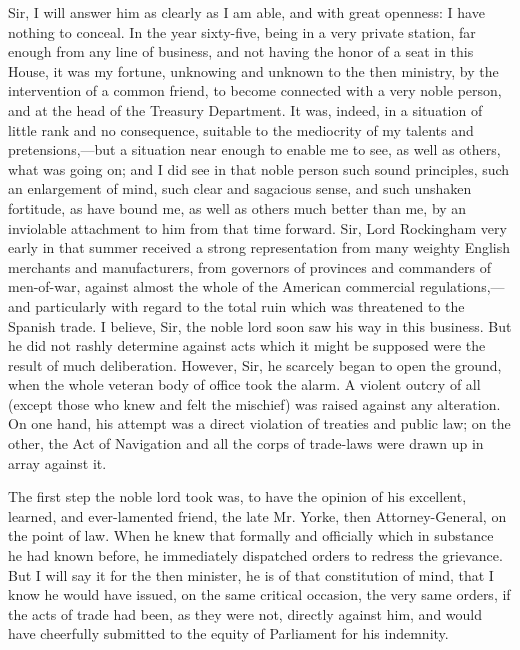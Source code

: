 Sir, I will answer him as clearly as I am able, and with great openness: I have nothing to conceal. In the year sixty-five, being in a very private station, far enough from any line of business, and not having the honor of a seat in this House, it was my fortune, unknowing and unknown to the then ministry, by the intervention of a common friend, to become connected with a very noble person, and at the head of the Treasury Department. It was, indeed, in a situation of little rank and no consequence, suitable to the mediocrity of my talents and pretensions,—but a situation near enough to enable me to see, as well as others, what was going on; and I did see in that noble person such sound principles, such an enlargement of mind, such clear and sagacious sense, and such unshaken fortitude, as have bound me, as well as others much better than me, by an inviolable attachment to him from that time forward. Sir, Lord Rockingham very early in that summer received a strong representation from many weighty English merchants and manufacturers, from governors of provinces and commanders of men-of-war, against almost the whole of the American commercial regulations,—and particularly with regard to the total ruin which was threatened to the Spanish trade. I believe, Sir, the noble lord soon saw his way in this business. But he did not rashly determine against acts which it might be supposed were the result of much deliberation. However, Sir, he scarcely began to open the ground, when the whole veteran body of office took the alarm. A violent outcry of all (except those who knew and felt the mischief) was raised against any alteration. On one hand, his attempt was a direct violation of treaties and public law; on the other, the Act of Navigation and all the corps of trade-laws were drawn up in array against it.

The first step the noble lord took was, to have the opinion of his excellent, learned, and ever-lamented friend, the late Mr. Yorke, then Attorney-General, on the point of law. When he knew that formally and officially which in substance he had known before, he immediately dispatched orders to redress the grievance. But I will say it for the then minister, he is of that constitution of mind, that I know he would have issued, on the same critical occasion, the very same orders, if the acts of trade had been, as they were not, directly against him, and would have cheerfully submitted to the equity of Parliament for his indemnity.

